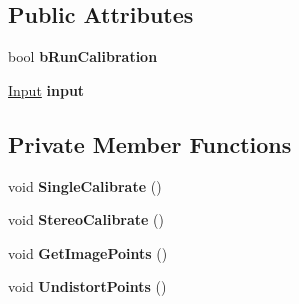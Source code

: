 \subsection*{Public Attributes}
\begin{DoxyCompactItemize}
\item 
\mbox{\label{class_calibration_a3853851a19671da230d151d8870c08a0}} 
bool {\bfseries b\+Run\+Calibration}
\item 
\mbox{\label{class_calibration_a103dff6e4359b09a0dd5f426d002ef17}} 
\mbox{\hyperlink{struct_calibration_1_1_input}{Input}} {\bfseries input}
\end{DoxyCompactItemize}
\subsection*{Private Member Functions}
\begin{DoxyCompactItemize}
\item 
\mbox{\label{class_calibration_af3312544fa5e8e9b52ce2ed53ce963ff}} 
void {\bfseries Single\+Calibrate} ()
\item 
\mbox{\label{class_calibration_a32a7f26cc88ba8cc04740f1a24aee03e}} 
void {\bfseries Stereo\+Calibrate} ()
\item 
\mbox{\label{class_calibration_a4b60943c3795d77f27497897dca60dfc}} 
void {\bfseries Get\+Image\+Points} ()
\item 
\mbox{\label{class_calibration_acf4fe8cb5290689e23841636def4f4ae}} 
void {\bfseries Undistort\+Points} ()
\end{DoxyCompactItemize}
